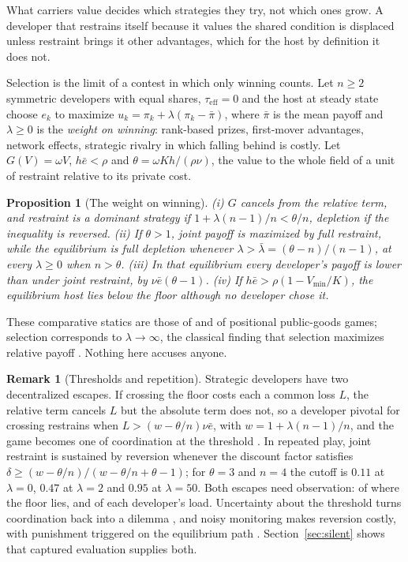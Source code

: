 \documentclass[letterpaper]{article} %
\newtheorem{proposition}{Proposition}
\theoremstyle{definition}
\newtheorem{remark}{Remark}
\newcommand{\Vmin}{V_{\min}}
\newcommand{\taueff}{\tau_{\mathrm{eff}}}
\begin{document}
What carriers value decides which strategies they try, not which ones grow. A developer that restrains itself because it values the shared condition is displaced unless restraint brings it other advantages, which for the host by definition it does not.

Selection is the limit of a contest in which only winning counts. Let $n\ge2$ symmetric developers with equal shares, $\taueff=0$ and the host at steady state choose $e_k$ to maximize $u_k=\pi_k+\lambda(\pi_k-\bar\pi)$, where $\bar\pi$ is the mean payoff and $\lambda\ge0$ is the \emph{weight on winning}: rank-based prizes, first-mover advantages, network effects, strategic rivalry in which falling behind is costly. Let $G(V)=\omega V$, $h\bar e<\rho$ and $\theta=\omega Kh/(\rho\nu)$, the value to the whole field of a unit of restraint relative to its private cost.

\begin{proposition}[The weight on winning]\label{prop:game}
(i) $G$ cancels from the relative term, and restraint is a dominant strategy if $1+\lambda(n-1)/n<\theta/n$, depletion if the inequality is reversed. (ii) If $\theta>1$, joint payoff is maximized by full restraint, while the equilibrium is full depletion whenever $\lambda>\bar\lambda=(\theta-n)/(n-1)$, at every $\lambda\ge0$ when $n>\theta$. (iii) In that equilibrium every developer's payoff is lower than under joint restraint, by $\nu\bar e(\theta-1)$. (iv) If $h\bar e>\rho(1-\Vmin/K)$, the equilibrium host lies below the floor although no developer chose it.
\end{proposition}

These comparative statics are those of \citet{armstrong2016} and of positional public-goods games; selection corresponds to $\lambda\to\infty$, the classical finding that selection maximizes relative payoff \citep{schaffer1988,schaffer1989}. Nothing here accuses anyone.

\begin{remark}[Thresholds and repetition]\label{rem:escape}
Strategic developers have two decentralized escapes. If crossing the floor costs each a common loss $L$, the relative term cancels $L$ but the absolute term does not, so a developer pivotal for crossing restrains when $L>(w-\theta/n)\nu\bar e$, with $w=1+\lambda(n-1)/n$, and the game becomes one of coordination at the threshold \citep{barrett2013}. In repeated play, joint restraint is sustained by reversion whenever the discount factor satisfies $\delta\ge(w-\theta/n)/(w-\theta/n+\theta-1)$; for $\theta=3$ and $n=4$ the cutoff is $0.11$ at $\lambda=0$, $0.47$ at $\lambda=2$ and $0.95$ at $\lambda=50$. Both escapes need observation: of where the floor lies, and of each developer's load. Uncertainty about the threshold turns coordination back into a dilemma \citep{barrettdannenberg2012}, and noisy monitoring makes reversion costly, with punishment triggered on the equilibrium path \citep{greenporter1984}. Section~\ref{sec:silent} shows that captured evaluation supplies both.
\end{remark}
\end{document}

